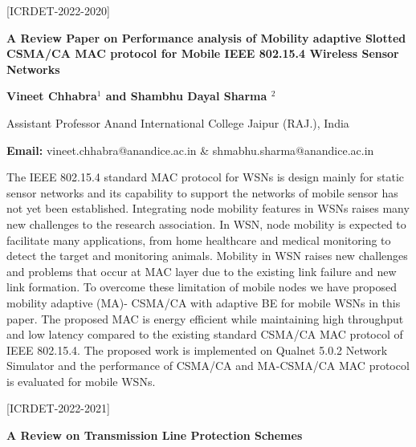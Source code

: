 \documentclass[twoside,11pt]{amsart}
\begin{document}
\vskip 5mm
\begin{flushleft}
\centerline{[ICRDET-2022-2020]}
\end{flushleft}
\begin{center}\bf\LARGE
A Review Paper on Performance analysis of Mobility adaptive
Slotted CSMA/CA MAC protocol for Mobile IEEE 802.15.4
Wireless Sensor Networks
\end{center}
\vskip 5mm

\centerline{\textbf{Vineet Chhabra$^{1}$ and Shambhu Dayal Sharma
$^{2}$   }}
\vskip 5mm
\begin{flushleft}
Assistant Professor
Anand International College
Jaipur (RAJ.), India
\vskip 5mm
\end{flushleft}
\vskip 2mm
\begin{flushleft}
{\bf Email:} vineet.chhabra@anandice.ac.in \& shmabhu.sharma@anandice.ac.in
\end{flushleft}
\vskip 5mm
The IEEE 802.15.4 standard MAC protocol for WSNs is design mainly for static
sensor networks and its capability to support the networks of mobile sensor has not yet
been established. Integrating node mobility features in WSNs raises many new
challenges to the research association. In WSN, node mobility is expected to facilitate
many applications, from home healthcare and medical monitoring to detect the target
and monitoring animals. Mobility in WSN raises new challenges and problems that
occur at MAC layer due to the existing link failure and new link formation. To
overcome these limitation of mobile nodes we have proposed mobility adaptive (MA)-
CSMA/CA with adaptive BE for mobile WSNs in this paper. The proposed MAC is
energy efficient while maintaining high throughput and low latency compared to the
existing standard CSMA/CA MAC protocol of IEEE 802.15.4. The proposed work is
implemented on Qualnet 5.0.2 Network Simulator and the performance of CSMA/CA
and MA-CSMA/CA MAC protocol is evaluated for mobile WSNs.
\newpage
\vskip 5mm
\begin{flushleft}
\centerline{[ICRDET-2022-2021]}
\end{flushleft}
\begin{center}\bf\LARGE
A Review on Transmission Line Protection Schemes
\end{center}
\vskip 5mm
\end{document}

